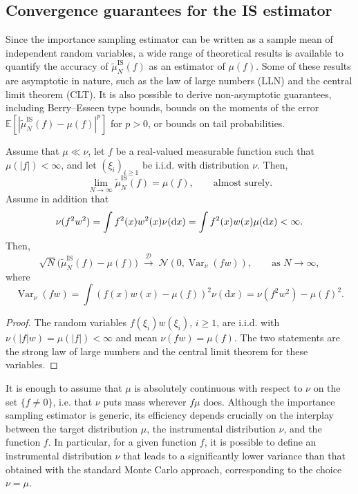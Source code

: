 \documentclass[english,graybox,envcountchap,envcountsame,sectrefs,shortlabels]{svmono}
\theoremstyle{style}
\newcommand{\eqsp}{}
\begin{document}
\subsection{Convergence guarantees for the IS estimator}
Since the importance sampling estimator can be written as a sample mean of independent random
variables, a wide range of theoretical results is available to quantify the
accuracy of $\tilde{\mu}^{\mathrm{IS}}_{N}(f)$ as an estimator of $\mu(f)$.
Some of these results are asymptotic in nature, such as the law of large numbers
(LLN) and the central limit theorem (CLT). It is also possible to derive
non-asymptotic guarantees, including Berry--Esseen type bounds, bounds on the
moments of the error $\mathbb{E}\!\left[\left|\tilde{\mu}^{\mathrm{IS}}_{N}(f)-\mu(f)\right|^p\right]$
for $p>0$, or bounds on tail probabilities.


\begin{theorem}\label{thm:IS-LLN-CLT}
Assume that $\mu\ll\nu$, let $f$ be a real-valued measurable function such that $\mu(|f|)<\infty$, and let $(\xi_i)_{i\geq 1}$ be i.i.d. with distribution $\nu$. Then,
\[
\lim_{N\to\infty} \tilde{\mu}^{\mathrm{IS}}_{N}(f) = \mu(f)\eqsp,
\qquad \text{almost surely.}
\]
Assume in addition that
\begin{equation}\label{eq:IS-second-moment}
\nu(f^2w^2) = \int f^2(x)w^2(x) \nu(\mathrm{d}x) = \int f^2(x)w(x)\mu(\mathrm{d} x)
< \infty.
\end{equation}
Then,
\[
\sqrt{N}\bigl(\tilde{\mu}^{\mathrm{IS}}_{N}(f)-\mu(f)\bigr)
\;\xrightarrow{\mathcal{D}}\;
\mathcal{N}\!\left(
0,
\operatorname{Var}_{\nu}\!\left(
fw
\right)
\right),
\qquad \text{as } N\to\infty,
\]
where
\[
\operatorname{Var}_{\nu}\!\left(
fw
\right)
=
\int \left(
f(x)w(x)-\mu(f)
\right)^2 \nu(\mathrm{d}x) = \nu(f^2w^2) - \mu(f)^2\eqsp.
\]
\end{theorem}
\begin{proof}
The random variables $f(\xi_i)w(\xi_i)$, $i\geq1$, are i.i.d. with $\nu(|f|w) = \mu(|f|)<\infty$ and mean $\nu(fw) = \mu(f)$. The two statements are the strong law of large numbers and the central limit theorem for these variables.
\end{proof}
It is enough to assume that $\mu$ is absolutely continuous with respect to $\nu$ on the set $\{f\neq0\}$, i.e. that $\nu$ puts mass wherever $f\mu$ does.
Although the importance sampling estimator is generic, its
efficiency depends crucially on the interplay between
the target distribution $\mu$, the instrumental distribution $\nu$, and the
function $f$. In particular, for a given function $f$, it is possible to
define an instrumental distribution $\nu$ that leads to a significantly lower
variance than that obtained with the standard Monte Carlo approach, corresponding
to the choice $\nu=\mu$.
\end{document}
